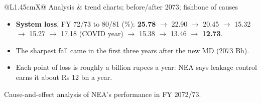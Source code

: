 {{\begin{tabularx}{\linewidth}{@{}L{1.45cm}X@{}}
Analysis & trend charts; before/after 2073; fishbone of causes \\
\bottomrule
\end{tabularx}}
\begin{itemize}
  \item \textbf{System loss}, FY 72/73 to 80/81 (\%): \textbf{25.78} $\rightarrow$ 22.90
    $\rightarrow$ 20.45 $\rightarrow$ 15.32 $\rightarrow$ 15.27 $\rightarrow$ 17.18 (COVID
    year) $\rightarrow$ 15.38 $\rightarrow$ 13.46 $\rightarrow$ \textbf{12.73}.
  \item The sharpest fall came in the first three years after the new MD (2073 Bh).
  \item Each point of loss is roughly a billion rupees a year: NEA says leakage control
    earns it about Rs 12 bn a year.
\end{itemize}}

{\small\color{sub}\centering Cause-and-effect analysis of NEA's performance in FY 2072/73.\par}

